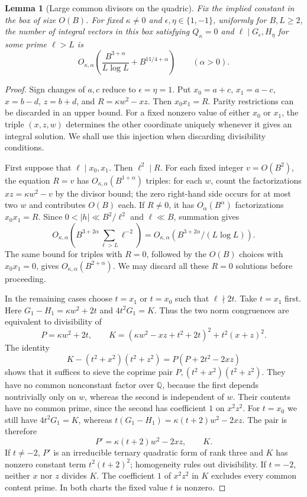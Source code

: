 \documentclass[11pt]{article}
\newtheorem{lemma}[theorem]{Lemma}
\theoremstyle{definition}
\theoremstyle{remark}
\begin{document}
\begin{lemma}[Large common divisors on the quadric]\label{lem:v5-large-sieve}
Fix the implied constant in the box of size $O(B)$.
For fixed $\kappa\ne0$ and $\epsilon,\eta\in\{1,-1\}$, uniformly for
$B,L\geq2$, the number of integral vectors in this box satisfying
$Q_\kappa=0$ and
$\ell\mid G_\epsilon,H_\eta$ for some prime $\ell>L$ is
\begin{equation}\label{eq:v5-large-sieve}
 O_{\kappa,\alpha}\left(
    \frac{B^{3+\alpha}}{L\log L}+B^{11/4+\alpha}\right)
 \qquad(\alpha>0).
\end{equation}
\end{lemma}
\begin{proof}
Sign changes of $a,c$ reduce to $\epsilon=\eta=1$.
Put $x_0=a+c$, $x_1=a-c$, $x=b-d$, $z=b+d$, and
$R=\kappa w^2-xz$. Then $x_0x_1=R$.
Parity restrictions can be discarded in an upper bound.
For a fixed nonzero value of either $x_0$ or $x_1$, the triple $(x,z,w)$
determines the other coordinate uniquely whenever it gives an integral
solution. We shall use this injection when discarding divisibility
conditions.

First suppose that $\ell\mid x_0,x_1$. Then $\ell^2\mid R$.
For each fixed integer $v=O(B^2)$, the equation $R=v$ has
$O_{\kappa,\alpha}(B^{1+\alpha})$ triples: for each $w$, count the
factorizations $xz=\kappa w^2-v$ by the divisor bound; the zero right-hand
side occurs for at most two $w$ and contributes $O(B)$ each.
If $R\ne0$, it has $O_\alpha(B^\alpha)$ factorizations $x_0x_1=R$.
Since $0<|h|\ll B^2/\ell^2$ and $\ell\ll B$, summation gives
\[
 O_{\kappa,\alpha}\left(
 B^{3+2\alpha}\sum_{\ell>L}\ell^{-2}\right)
 =O_{\kappa,\alpha}(B^{3+2\alpha}/(L\log L)).
\]
The same bound for triples with $R=0$, followed by the $O(B)$ choices
with $x_0x_1=0$, gives $O_{\kappa,\alpha}(B^{2+\alpha})$.
We may discard all these $R=0$ solutions before proceeding.

In the remaining cases choose $t=x_1$ or $t=x_0$ such that $\ell\nmid2t$.
Take $t=x_1$ first. Here
$G_1-H_1=\kappa w^2+2t$ and $4t^2G_1=K$.
Thus the two norm congruences are equivalent to divisibility of
\[
 P=\kappa w^2+2t,\qquad
 K=(\kappa w^2-xz+t^2+2t)^2+t^2(x+z)^2.
\]
The identity
\[
 K-(t^2+x^2)(t^2+z^2)=P(P+2t^2-2xz)
\]
shows that it suffices to sieve the coprime pair
$P,(t^2+x^2)(t^2+z^2)$. They have no common nonconstant factor over
$\mathbb Q$, because the first depends nontrivially only on $w$, whereas
the second is independent of $w$. Their contents have no common prime,
since the second has coefficient $1$ on $x^2z^2$.
For $t=x_0$ we still have $4t^2G_1=K$, whereas
$t(G_1-H_1)=\kappa(t+2)w^2-2xz$. The pair is therefore
\[
 P'=\kappa(t+2)w^2-2xz,\qquad K.
\]
If $t\ne-2$, $P'$ is an irreducible ternary quadratic form of rank three
and $K$ has nonzero constant term $t^2(t+2)^2$; homogeneity rules out
divisibility. If $t=-2$, neither $x$ nor $z$ divides $K$.
The coefficient $1$ of $x^2z^2$ in $K$ excludes every common content
prime. In both charts the fixed value $t$ is nonzero.


\end{proof}
\end{document}
